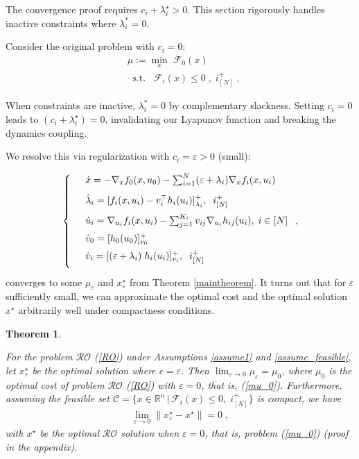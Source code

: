 \documentclass[journal,twoside,web]{ieeecolor}
\newtheorem{theorem}{Theorem}
\begin{document}
The convergence proof requires $c_i+\lambda_i^\star>0$. This section rigorously handles inactive constraints where $\lambda_i^* = 0$.

Consider the original problem with $c_i=0$:
\begin{align} \label{mu_0}
&\mu:=\underset{x}{\min} \; \mathcal{F}_0(x)\\
&\;\;\text{s.t.}\;\;\;\mathcal{F}_i(x)\leq 0\;,\;i^+_{[N]}\;,\nonumber
\end{align}

When constraints are inactive, $\lambda_i^* = 0$ by complementary slackness. Setting $c_i = 0$ leads to $(c_i+\lambda_i^\star)=0$, invalidating our Lyapunov function and breaking the dynamics coupling.

We resolve this via regularization with $c_i=\varepsilon>0$ (small):

\begin{align} \label{pd_dynamics_ep}
\left\{
\begin{array}{cl}
\vspace{3mm}
&\dot x=-\nabla_x f_0(x,u_0)- \sum_{i=1}^N(\varepsilon+\lambda_i) \nabla_x f_i(x,u_i)\\
\vspace{2mm}
&\dot \lambda_i=[f_i(x,u_i)-v_i^\top h_i(u_i)]_{\lambda_i}^+,\;\; i^+_{[N]}\\
\vspace{2mm}
&\dot u_i=\nabla_{u_i}f_i(x,u_i)-  \sum_{j=1}^{K_i} v_{ij} \nabla_{u_i} h_{ij}(u_i),\; i\in[N]\\
\vspace{2mm}
&\dot{v}_0=[h_0(u_0)]_{v_0}^+\\
\vspace{2mm}
&\dot v_i=[(\varepsilon+\lambda_i) \; h_i(u_i)]_{v_i}^+,\;\;i^+_{[N]}
\end{array}\right.,
\end{align}
converges to some $\mu_{\varepsilon}$ and $x^\star_{\varepsilon}$ from Theorem \ref{maintheorem}. It turns out that for $\varepsilon$ sufficiently small, we can approximate the optimal cost and the optimal solution $x^\star$ arbitrarily well under compactness conditions.

\begin{theorem} \label{RO_ROperturbed}

For the problem $\mathcal{RO}$ (\ref{RO}) under Assumptions \ref{assume1} and \ref{assume_feasible}, let $x^\star_\varepsilon$ be the optimal solution where $c=\varepsilon$. Then
$\displaystyle\lim_{\varepsilon \to 0}\mu_\varepsilon=\mu_0$, where $\mu_0$ is the optimal cost of problem $\mathcal{RO}$ (\ref{RO}) with $\varepsilon=0$, that is, (\ref{mu_0}). Furthermore, assuming the feasible set $\mathcal{C}=\{x\in \mathbb{R}^n\,|\,\mathcal{F}_i(x)\leq 0,\; i^+_{[N]}\}$ is compact, we have
\begin{align*}
\displaystyle\lim_{\varepsilon \to 0} \parallel x_\varepsilon^\star-x^\star \parallel=0\;,
\end{align*}
with $x^\star$ be the optimal $\mathcal{RO}$ solution when $\varepsilon=0$, that is, problem (\ref{mu_0}) (proof in the appendix).
\end{theorem}
\end{document}
